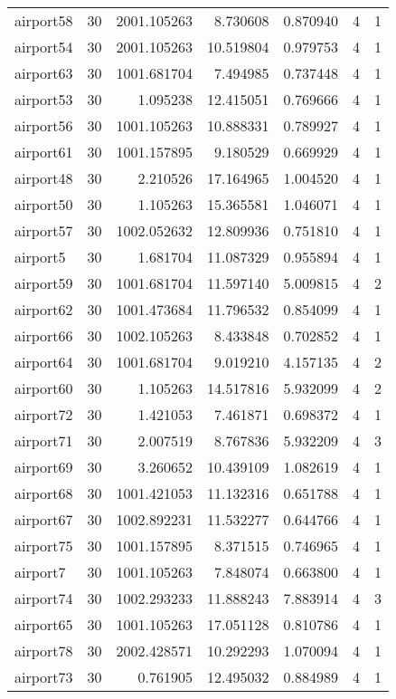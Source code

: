 \documentclass[../../../thesis.tex]{subfiles}
\begin{document}
\begin{longtable}{|l|r|r|r|r|r|r|}
airport58 & 30 & 2001.105263 & 8.730608 & 0.870940 & 4 & 1 \\
airport54 & 30 & 2001.105263 & 10.519804 & 0.979753 & 4 & 1 \\
airport63 & 30 & 1001.681704 & 7.494985 & 0.737448 & 4 & 1 \\
airport53 & 30 & 1.095238 & 12.415051 & 0.769666 & 4 & 1 \\
airport56 & 30 & 1001.105263 & 10.888331 & 0.789927 & 4 & 1 \\
airport61 & 30 & 1001.157895 & 9.180529 & 0.669929 & 4 & 1 \\
airport48 & 30 & 2.210526 & 17.164965 & 1.004520 & 4 & 1 \\
airport50 & 30 & 1.105263 & 15.365581 & 1.046071 & 4 & 1 \\
airport57 & 30 & 1002.052632 & 12.809936 & 0.751810 & 4 & 1 \\
airport5 & 30 & 1.681704 & 11.087329 & 0.955894 & 4 & 1 \\
airport59 & 30 & 1001.681704 & 11.597140 & 5.009815 & 4 & 2 \\
airport62 & 30 & 1001.473684 & 11.796532 & 0.854099 & 4 & 1 \\
airport66 & 30 & 1002.105263 & 8.433848 & 0.702852 & 4 & 1 \\
airport64 & 30 & 1001.681704 & 9.019210 & 4.157135 & 4 & 2 \\
airport60 & 30 & 1.105263 & 14.517816 & 5.932099 & 4 & 2 \\
airport72 & 30 & 1.421053 & 7.461871 & 0.698372 & 4 & 1 \\
airport71 & 30 & 2.007519 & 8.767836 & 5.932209 & 4 & 3 \\
airport69 & 30 & 3.260652 & 10.439109 & 1.082619 & 4 & 1 \\
airport68 & 30 & 1001.421053 & 11.132316 & 0.651788 & 4 & 1 \\
airport67 & 30 & 1002.892231 & 11.532277 & 0.644766 & 4 & 1 \\
airport75 & 30 & 1001.157895 & 8.371515 & 0.746965 & 4 & 1 \\
airport7 & 30 & 1001.105263 & 7.848074 & 0.663800 & 4 & 1 \\
airport74 & 30 & 1002.293233 & 11.888243 & 7.883914 & 4 & 3 \\
airport65 & 30 & 1001.105263 & 17.051128 & 0.810786 & 4 & 1 \\
airport78 & 30 & 2002.428571 & 10.292293 & 1.070094 & 4 & 1 \\
airport73 & 30 & 0.761905 & 12.495032 & 0.884989 & 4 & 1 \\

\end{longtable}
\end{document}
